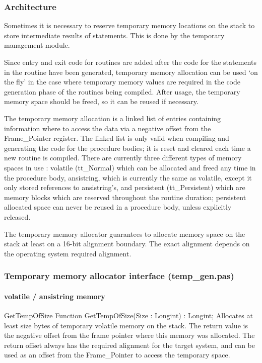 \documentclass [a4paper,12pt]{article}
\begin{document}
\subsubsection{Architecture}
\label{subsubsec:architecturemory}

Sometimes it is necessary to reserve temporary memory locations on the stack
to store intermediate results of statements. This is done by the temporary
management module.

Since entry and exit code for routines are added after the code for the
statements in the routine have been generated, temporary memory allocation
can be used `on the fly' in the case where temporary memory values are
required in the code generation phase of the routines being compiled. After
usage, the temporary memory space should be freed, so it can be reused if
necessary.

The temporary memory allocation is a linked list of entries containing
information where to access the data via a negative offset from the
Frame{\_}Pointer register. The linked list is only valid when compiling and
generating the code for the procedure bodies; it is reset and cleared each
time a new routine is compiled. There are currently three different types of
memory spaces in use : volatile (\textsf{tt{\_}Normal}) which can be
allocated and freed any time in the procedure body, ansistring, which is
currently the same as volatile, except it only stored references to
ansistring's, and persistent (\textsf{tt{\_}Persistent}) which are memory
blocks which are reserved throughout the routine duration; persistent
allocated space can never be reused in a procedure body, unless explicitly
released.

The temporary memory allocator guarantees to allocate memory space on the
stack at least on a 16-bit alignment boundary. The exact alignment depends
on the operating system required alignment.

\subsubsection{Temporary memory allocator interface (temp{\_}gen.pas)}
\label{subsubsec:temporary}

\paragraph{volatile / ansistring memory}

\begin{function}{GetTempOfSize}
\Declaration
Function GetTempOfSize(Size : Longint) : Longint;
\Description
Allocates at least \textsf{size} bytes of temporary volatile memory on the
stack. The return value is the negative offset from the frame pointer where
this memory was allocated.
\Notes
The return offset always has the required alignment for the target system,
and can be used as an offset from the Frame{\_}Pointer to access the
temporary space.
\end{function}
\end{document}
